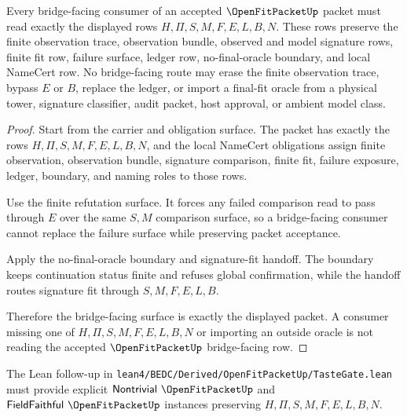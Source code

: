 \begin{theorem}
\label{thm:open-fit-packet-bridge-facing-surface}
Every bridge-facing consumer of an accepted $\OpenFitPacketUp$ packet must read exactly the displayed rows $H,\Pi,S,M,F,E,L,B,N$. These rows preserve the finite observation trace, observation bundle, observed and model signature rows, finite fit row, failure surface, ledger row, no-final-oracle boundary, and local NameCert row. No bridge-facing route may erase the finite observation trace, bypass $E$ or $B$, replace the ledger, or import a final-fit oracle from a physical tower, signature classifier, audit packet, host approval, or ambient model class.
\end{theorem}
\begin{proof}
Start from the carrier and obligation surface. The packet has exactly the rows $H,\Pi,S,M,F,E,L,B,N$, and the local NameCert obligations assign finite observation, observation bundle, signature comparison, finite fit, failure exposure, ledger, boundary, and naming roles to those rows.

Use the finite refutation surface. It forces any failed comparison read to pass through $E$ over the same $S,M$ comparison surface, so a bridge-facing consumer cannot replace the failure surface while preserving packet acceptance.

Apply the no-final-oracle boundary and signature-fit handoff. The boundary keeps continuation status finite and refuses global confirmation, while the handoff routes signature fit through $S,M,F,E,L,B$.

Therefore the bridge-facing surface is exactly the displayed packet. A consumer missing one of $H,\Pi,S,M,F,E,L,B,N$ or importing an outside oracle is not reading the accepted $\OpenFitPacketUp$ bridge-facing row.
\end{proof}

The Lean follow-up in \texttt{lean4/BEDC/Derived/OpenFitPacketUp/TasteGate.lean} must provide explicit $\mathsf{Nontrivial}\ \OpenFitPacketUp$ and $\mathsf{FieldFaithful}\ \OpenFitPacketUp$ instances preserving $H,\Pi,S,M,F,E,L,B,N$.



